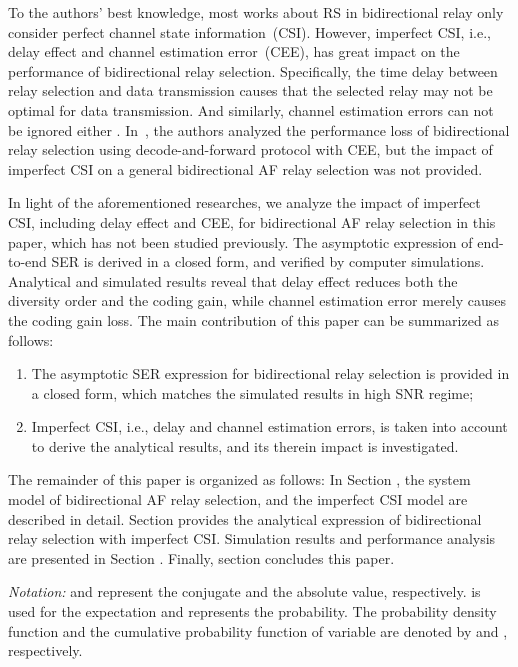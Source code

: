 \documentclass[onecolumn,letterpaper,11pt,draftclsnofoot]{IEEEtran}
\begin{document}
To the authors' best knowledge, most works about RS in bidirectional
relay only consider perfect channel state information~(CSI).
However, imperfect CSI, i.e., delay effect and channel estimation
error~(CEE), has great impact on the performance of bidirectional
relay selection. Specifically, the time delay between relay
selection and data transmission causes that the selected relay may
not be optimal for data
transmission\cite{Torabi2010,Suraweera2010,Michalopoulos2010}. And
similarly, channel estimation errors can not be ignored either
\cite{Seyfi2010,Seung2009,Gedik2009,Ding2011}. In~\cite{Ding2011},
the authors analyzed the performance loss of bidirectional relay
selection using decode-and-forward protocol with CEE, but the impact
of imperfect CSI on a general bidirectional AF relay selection was
not provided.

In light of the aforementioned researches, we analyze the impact of
imperfect CSI, including delay effect and CEE, for bidirectional AF
relay selection in this paper, which has not been studied
previously. The asymptotic expression of end-to-end SER is derived
in a closed form, and verified by computer simulations. Analytical
and simulated results reveal that delay effect reduces both the
diversity order and the coding gain, while channel estimation error
merely causes the coding gain loss. The main contribution of this paper can be summarized as
follows:
\begin{enumerate}
  \item The asymptotic SER expression for bidirectional relay selection is provided in a closed form, which matches the simulated results in high SNR regime;
  \item Imperfect CSI, i.e., delay and channel estimation errors, is taken into account to derive the analytical results, and its therein impact is investigated.
\end{enumerate}

The remainder of this paper is organized as follows: In Section
\uppercase\expandafter{}, the system model of
bidirectional AF relay selection, and the imperfect CSI model are
described in detail. Section \uppercase\expandafter{}
provides the analytical expression of bidirectional relay selection
with imperfect CSI. Simulation results and performance analysis are
presented in Section \uppercase\expandafter{}.
Finally, section \uppercase\expandafter{} concludes
this paper.

\emph{Notation:} and  represent the conjugate and the absolute value, respectively.  is used for the expectation and  represents the probability. The probability density function and the cumulative probability function of variable  are denoted by  and , respectively.
\end{document}
